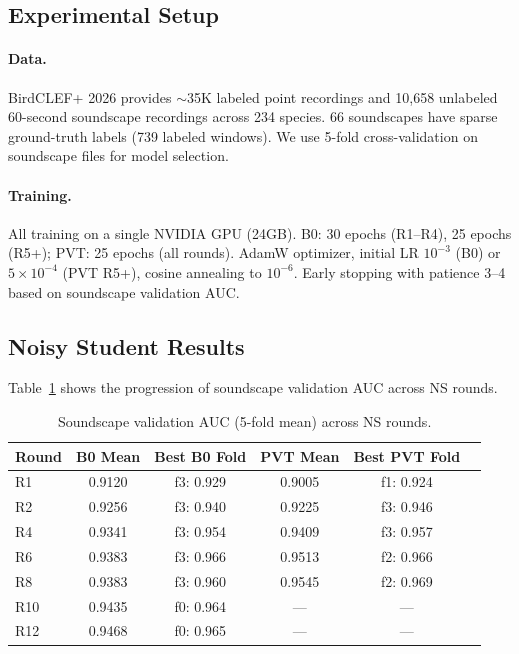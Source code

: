 \documentclass[a4paper]{article}
\begin{document}
\subsection{Experimental Setup}

\paragraph{Data.}
BirdCLEF+ 2026 provides $\sim$35K labeled point recordings and 10,658 unlabeled 60-second soundscape recordings across 234 species.
66 soundscapes have sparse ground-truth labels (739 labeled windows).
We use 5-fold cross-validation on soundscape files for model selection.

\paragraph{Training.}
All training on a single NVIDIA GPU (24GB).
B0: 30 epochs (R1--R4), 25 epochs (R5+); PVT: 25 epochs (all rounds).
AdamW optimizer, initial LR $10^{-3}$ (B0) or $5 \times 10^{-4}$ (PVT R5+), cosine annealing to $10^{-6}$.
Early stopping with patience 3--4 based on soundscape validation AUC.

\subsection{Noisy Student Results}

Table~\ref{tab:ns_rounds} shows the progression of soundscape validation AUC across NS rounds.

\begin{table}[t]
\centering
\caption{Soundscape validation AUC (5-fold mean) across NS rounds.}
\label{tab:ns_rounds}
\small
\begin{tabular}{lccccc}
\toprule
Round & B0 Mean & Best B0 Fold & PVT Mean & Best PVT Fold \\
\midrule
R1  & 0.9120 & f3: 0.929 & 0.9005 & f1: 0.924 \\
R2  & 0.9256 & f3: 0.940 & 0.9225 & f3: 0.946 \\
R4  & 0.9341 & f3: 0.954 & 0.9409 & f3: 0.957 \\
R6  & 0.9383 & f3: 0.966 & 0.9513 & f2: 0.966 \\
R8  & 0.9383 & f3: 0.960 & 0.9545 & f2: 0.969 \\
R10 & 0.9435 & f0: 0.964 & --- & --- \\
R12 & 0.9468 & f0: 0.965 & --- & --- \\
\bottomrule
\end{tabular}
\end{table}
\end{document}
